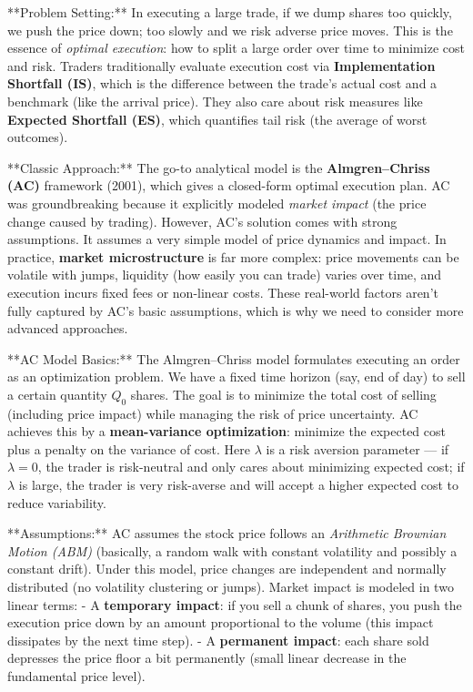 \documentclass[11pt]{article}
\newcommand{\note}[1]{#1}
\begin{document}
\note{
	**Problem Setting:** In executing a large trade, if we dump shares too quickly, we push the price down; too slowly and we risk adverse price moves. This is the essence of \textit{optimal execution}: how to split a large order over time to minimize cost and risk. Traders traditionally evaluate execution cost via \textbf{Implementation Shortfall (IS)}, which is the difference between the trade’s actual cost and a benchmark (like the arrival price). They also care about risk measures like \textbf{Expected Shortfall (ES)}, which quantifies tail risk (the average of worst outcomes). 
	
	**Classic Approach:** The go-to analytical model is the \textbf{Almgren–Chriss (AC)} framework (2001), which gives a closed-form optimal execution plan. AC was groundbreaking because it explicitly modeled \textit{market impact} (the price change caused by trading). However, AC’s solution comes with strong assumptions. It assumes a very simple model of price dynamics and impact. In practice, \textbf{market microstructure} is far more complex: price movements can be volatile with jumps, liquidity (how easily you can trade) varies over time, and execution incurs fixed fees or non-linear costs. These real-world factors aren’t fully captured by AC’s basic assumptions, which is why we need to consider more advanced approaches.
}


	**AC Model Basics:** The Almgren–Chriss model formulates executing an order as an optimization problem. We have a fixed time horizon (say, end of day) to sell a certain quantity $Q_0$ shares. The goal is to minimize the total cost of selling (including price impact) while managing the risk of price uncertainty. AC achieves this by a \textbf{mean-variance optimization}: minimize the expected cost plus a penalty on the variance of cost. Here $\lambda$ is a risk aversion parameter — if $\lambda=0$, the trader is risk-neutral and only cares about minimizing expected cost; if $\lambda$ is large, the trader is very risk-averse and will accept a higher expected cost to reduce variability.
	
	**Assumptions:** AC assumes the stock price follows an \textit{Arithmetic Brownian Motion (ABM)} (basically, a random walk with constant volatility and possibly a constant drift). Under this model, price changes are independent and normally distributed (no volatility clustering or jumps). Market impact is modeled in two linear terms:
	- A \textbf{temporary impact}: if you sell a chunk of shares, you push the execution price down by an amount proportional to the volume (this impact dissipates by the next time step).
	- A \textbf{permanent impact}: each share sold depresses the price floor a bit permanently (small linear decrease in the fundamental price level).
	
\end{document}
